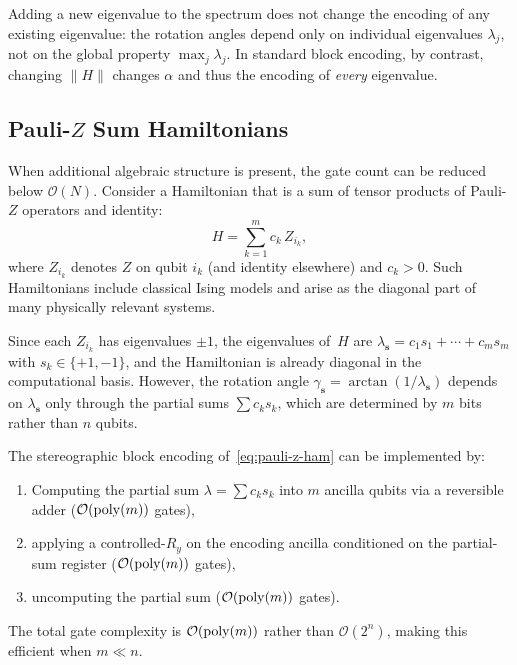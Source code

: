 \begin{remark}
	Adding a new eigenvalue to the spectrum does not change the
	encoding of any existing eigenvalue: the rotation angles depend
	only on individual eigenvalues $\lambda_j$, not on the global
	property $\max_j \lambda_j$.  In standard block encoding, by
	contrast, changing $\|H\|$ changes $\alpha$ and thus the
	encoding of \emph{every} eigenvalue.
\end{remark}

\subsection{Pauli-\texorpdfstring{$Z$}{Z} Sum Hamiltonians}
\label{subsec:pauli-z}

When additional algebraic structure is present, the gate count
can be reduced below $\mathcal{O}(N)$.  Consider a Hamiltonian
that is a sum of tensor products of Pauli-$Z$ operators and
identity:
\begin{equation}
	H = \sum_{k=1}^{m} c_k\, Z_{i_k},
	\label{eq:pauli-z-ham}
\end{equation}
where $Z_{i_k}$ denotes $Z$ on qubit $i_k$ (and identity
elsewhere) and $c_k > 0$.  Such Hamiltonians include classical
Ising models and arise as the diagonal part of many physically
relevant systems.

Since each $Z_{i_k}$ has eigenvalues $\pm 1$, the eigenvalues
of~$H$ are
$\lambda_{\mathbf{s}} = c_1 s_1 + \cdots + c_m s_m$ with
$s_k \in \{+1, -1\}$, and the Hamiltonian is already diagonal in
the computational basis.  However, the rotation angle
$\gamma_\mathbf{s} = \arctan(1/\lambda_\mathbf{s})$ depends on
$\lambda_\mathbf{s}$ only through the partial sums
$\sum c_k s_k$, which are determined by $m$ bits rather than $n$
qubits.

\begin{proposition}
	\label{prop:pauli-z-gates}
	The stereographic block encoding
	of~\eqref{eq:pauli-z-ham} can be implemented by:
	\begin{enumerate}
		\item Computing the partial sum
		      $\lambda = \sum c_k s_k$ into $m$ ancilla
		      qubits via a reversible adder
		      ($\mathcal{O}(\mathrm{poly}(m))$ gates),
		\item applying a controlled-$R_y$ on the encoding
		      ancilla conditioned on the partial-sum
		      register ($\mathcal{O}(\mathrm{poly}(m))$ gates),
		\item uncomputing the partial sum
		      ($\mathcal{O}(\mathrm{poly}(m))$ gates).
	\end{enumerate}
	The total gate complexity is $\mathcal{O}(\mathrm{poly}(m))$
	rather than $\mathcal{O}(2^n)$, making this efficient
	when $m \ll n$.
\end{proposition}

